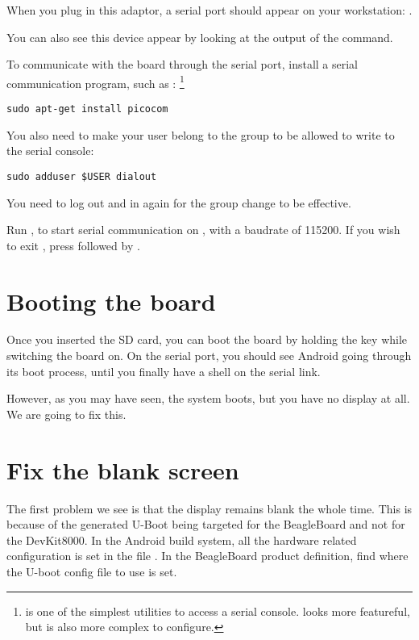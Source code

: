 When you plug in this adaptor, a serial port should appear on your
workstation: .

You can also see this device appear by looking at the output of the
 command.

To communicate with the board through the serial port, install a
serial communication program, such as :
\footnote{ is one of the simplest utilities to access a
  serial console.  looks more featureful, but is also
  more complex to configure.}

\begin{verbatim}
sudo apt-get install picocom
\end{verbatim}

You also need to make your user belong to the  group to be
allowed to write to the serial console:

\begin{verbatim}
sudo adduser $USER dialout
\end{verbatim}

You need to log out and in again for the group change to be effective.

Run , to start serial
communication on , with a baudrate of 115200. If
you wish to exit , press \code{[Ctrl][a]} followed by
\code{[Ctrl][x]}.

\section{Booting the board}

Once you inserted the SD card, you can boot the board by holding the
 key while switching the board on. On the serial port, you
should see Android going through its boot process, until you finally
have a shell on the serial link.

However, as you may have seen, the system boots, but you have no
display at all. We are going to fix this.

\section{Fix the blank screen}

The first problem we see is that the display remains blank the whole
time. This is because of the generated U-Boot being targeted for the
BeagleBoard and not for the DevKit8000. In the Android build system,
all the hardware related configuration is set in the file
. In the BeagleBoard product definition, find
where the U-boot config file to use is set.

